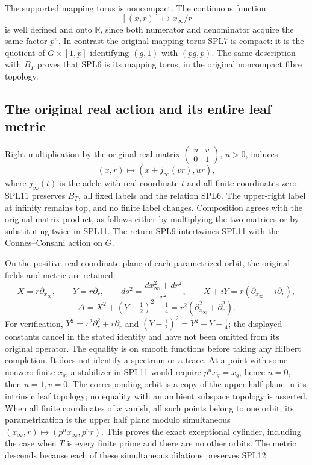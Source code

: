The supported mapping torus is noncompact. The continuous function
\begin{equation}\tag{SPL10}
[(x,r)]\longmapsto x_\infty/r
\end{equation}
is well defined and onto $\mathbb R$, since both numerator and
denominator acquire the same factor $p^n$. In contrast the original
mapping torus SPL7 is compact: it is the quotient of
$G\times[1,p]$ identifying $(g,1)$ with $(pg,p)$.
The same description with $B_T$ proves that SPL6 is its mapping
torus, in the original noncompact fibre topology.

\subsection{The original real action and its entire leaf metric}

Right multiplication by the original real matrix
$\left(\begin{smallmatrix}u&v\\0&1\end{smallmatrix}\right)$,
$u>0$, induces
\begin{equation}\tag{SPL11}
(x,r)\longmapsto(x+j_\infty(vr),ur),
\end{equation}
where $j_\infty(t)$ is the adele with real coordinate $t$ and all
finite coordinates zero. SPL11 preserves $B_T$, all fixed labels and
the relation SPL6. The upper-right label at infinity remains top,
and no finite label changes. Composition agrees with the original
matrix product, as follows either by multiplying the two matrices
or by substituting twice in SPL11. The return SPL9 intertwines
SPL11 with the Connes--Consani action on $G$.

On the positive real coordinate plane of each parametrized orbit,
the original fields and metric are retained:
\begin{equation}\tag{SPL12}
X=r\partial_{x_\infty},\qquad Y=r\partial_r,\qquad
ds^2=\frac{dx_\infty^2+dr^2}{r^2},\qquad
X+iY=r(\partial_{x_\infty}+i\partial_r),
\end{equation}
\begin{equation}\tag{SPL13}
\Delta=X^2+(Y-\tfrac12)^2-\tfrac14
=r^2(\partial_{x_\infty}^2+\partial_r^2).
\end{equation}
For verification, $Y^2=r^2\partial_r^2+r\partial_r$ and
$(Y-\tfrac12)^2=Y^2-Y+\tfrac14$; the displayed constants cancel
in the stated identity and have not been omitted from its original
operator. The equality is on smooth functions before taking any
Hilbert completion. It does not identify a spectrum or a trace.
At a point with some nonzero finite $x_q$, a stabilizer in SPL11
would require $p^n x_q=x_q$, hence $n=0$, then $u=1,v=0$.
The corresponding orbit is a copy of the upper half plane in its
intrinsic leaf topology; no equality with an ambient subspace topology
is asserted. When all
finite coordinates of $x$ vanish, all such points belong to one orbit;
its parametrization is the upper half plane modulo simultaneous
$(x_\infty,r)\mapsto(p^n x_\infty,p^n r)$. This proves the exact
exceptional cylinder, including the case when $T$ is every finite
prime and there are no other orbits. The metric descends because
each of these simultaneous dilations preserves SPL12.

